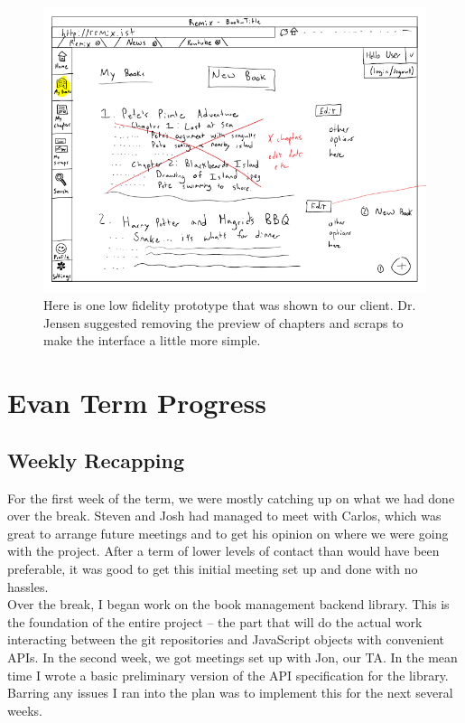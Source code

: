 \documentclass[onecolumn, draftclsnofoot,10pt, compsoc]{IEEEtran}
\begin{document}
	\begin{figure}[ht!]
	\centering
	\includegraphics[width=140mm]{prototype.png}
	\caption{Here is one low fidelity prototype that was shown to our client. Dr. Jensen suggested 
	removing the preview of chapters and scraps to make the interface a little more simple.}
	\end{figure}	


\section{Evan Term Progress}

\subsection{Weekly Recapping}
\noindent For the first week of the term, we were mostly catching up on what we had done
over the break. Steven and Josh had managed to meet with Carlos, which was great
to arrange future meetings and to get his opinion on where we were going with
the project. After a term of lower levels of contact than would have been
preferable, it was good to get this initial meeting set up and done with no
hassles. \\

\noindent Over the break, I began work on the book management backend library. This is the
foundation of the entire project -- the part that will do the actual work
interacting between the git repositories and JavaScript objects with convenient
APIs. In the second week, we got meetings set up with Jon, our TA. In the mean time I
wrote a basic preliminary version of the API specification for the library.
Barring any issues I ran into the plan was to implement this for the next
several weeks. \\
\end{document}
